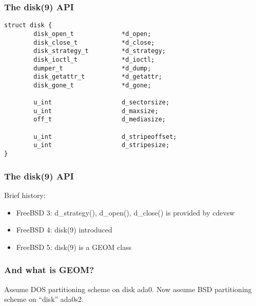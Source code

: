 \documentclass{beamer}
\begin{document}
\begin{frame}[fragile]
\frametitle{The disk(9) API}
\small\begin{verbatim}
struct disk {
        disk_open_t             *d_open;
        disk_close_t            *d_close;
        disk_strategy_t         *d_strategy;
        disk_ioctl_t            *d_ioctl;
        dumper_t                *d_dump;
        disk_getattr_t          *d_getattr;
        disk_gone_t             *d_gone;

        u_int                   d_sectorsize;
        u_int                   d_maxsize;
        off_t                   d_mediasize;

        u_int                   d_stripeoffset;
        u_int                   d_stripesize;
}
\end{verbatim}
\end{frame}


\begin{frame}
\frametitle{The disk(9) API}
Brief history:
\begin{itemize}
  \item{FreeBSD 3: d\_strategy(), d\_open(), d\_close() is provided by cdevsw}
  \item{FreeBSD 4: disk(9) introduced}
  \item{FreeBSD 5: disk(9) is a GEOM class}
\end{itemize}
\end{frame}


\begin{frame}
\frametitle{And what is GEOM?}
Assume DOS partitioning scheme on disk ada0.
 {
  Now assume BSD partitioning scheme on ``disk'' ada0s2.
}
  \begin{figure}
  \end{figure}
\end{frame}
\end{document}
